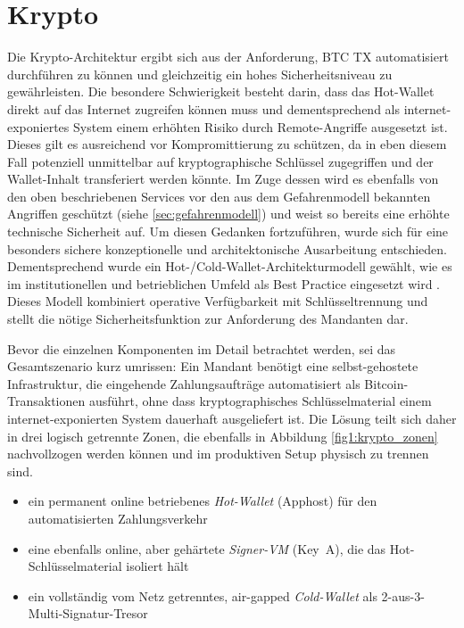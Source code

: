\section{Krypto}
\label{Krypto}
Die Krypto-Architektur ergibt sich aus der Anforderung, \ac{BTC} \ac{TX} automatisiert durchführen zu können und gleichzeitig ein hohes Sicherheitsniveau zu gewährleisten.
Die besondere Schwierigkeit besteht darin, dass das Hot-Wallet direkt auf das Internet zugreifen können muss und dementsprechend als internet-exponiertes System einem erhöhten Risiko durch Remote-Angriffe ausgesetzt ist.
Dieses gilt es ausreichend vor Kompromittierung zu schützen, da in eben diesem Fall potenziell unmittelbar auf kryptographische Schlüssel zugegriffen und der Wallet-Inhalt transferiert werden könnte.
Im Zuge dessen wird es ebenfalls von den oben beschriebenen Services vor den aus dem Gefahrenmodell bekannten Angriffen geschützt (siehe \ref{sec:gefahrenmodell}) und weist so bereits eine erhöhte technische Sicherheit auf.
Um diesen Gedanken fortzuführen, wurde sich für eine besonders sichere konzeptionelle und architektonische Ausarbeitung entschieden. Dementsprechend wurde ein Hot-/Cold-Wallet-Architekturmodell gewählt, wie es im institutionellen und betrieblichen Umfeld als Best Practice eingesetzt wird \cite{knowingbitcoin_hotcold,nadcab_custodial_arch,riskpublishing_hotcold}. Dieses Modell kombiniert operative Verfügbarkeit mit Schlüsseltrennung und stellt die nötige Sicherheitsfunktion zur Anforderung des Mandanten dar.

Bevor die einzelnen Komponenten im Detail betrachtet werden, sei das Gesamtszenario kurz umrissen: Ein Mandant benötigt eine selbst-gehostete Infrastruktur, die eingehende Zahlungsaufträge automatisiert als Bitcoin-Transaktionen ausführt, ohne dass kryptographisches Schlüsselmaterial einem internet-exponierten System dauerhaft ausgeliefert ist. Die Lösung teilt sich daher in drei logisch getrennte Zonen, die ebenfalls in Abbildung \ref{fig1:krypto_zonen} nachvollzogen werden können und im produktiven Setup physisch zu trennen sind.
\begin{itemize}
    \item ein permanent online betriebenes \emph{Hot-Wallet} (Apphost) für den automatisierten Zahlungsverkehr
    \item eine ebenfalls online, aber gehärtete \emph{Signer-\ac{VM}} (Key~A), die das Hot-Schlüsselmaterial isoliert hält
    \item ein vollständig vom Netz getrenntes, air-gapped \emph{Cold-Wallet}  als 2-aus-3-Multi-Signatur-Tresor
\end{itemize}

